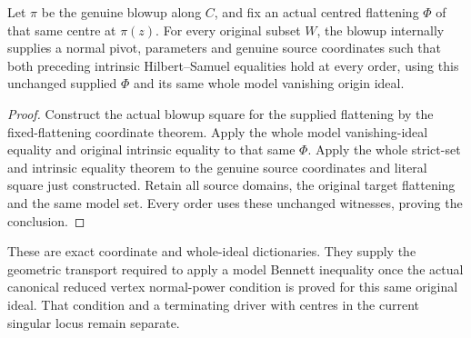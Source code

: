 \begin{theorem}
\label{hir:actual-fixed-flattening-original-blowup-hs-comparisons}
\leanok
Let $\pi$ be the genuine blowup along $C$, and fix an actual
centred flattening $\Phi$ of that same centre at $\pi(z)$.
For every original subset $W$, the blowup internally supplies
a normal pivot, parameters and genuine source coordinates
such that both preceding intrinsic Hilbert--Samuel equalities
hold at every order, using this unchanged supplied $\Phi$
and its same whole model vanishing origin ideal.
\end{theorem}
\begin{proof}
Construct the actual blowup square for the supplied flattening
by the fixed-flattening coordinate theorem. Apply the whole
model vanishing-ideal equality and original intrinsic equality
to that same $\Phi$. Apply the whole strict-set and intrinsic
equality theorem to the genuine source coordinates and literal
square just constructed. Retain all source domains, the
original target flattening and the same model set. Every
order uses these unchanged witnesses, proving the conclusion.
\end{proof}

\begin{remark}
These are exact coordinate and whole-ideal dictionaries.
They supply the geometric transport required to apply a
model Bennett inequality once the actual canonical reduced
vertex normal-power condition is proved for this same
original ideal. That condition and a terminating driver
with centres in the current singular locus remain separate.
\end{remark}
